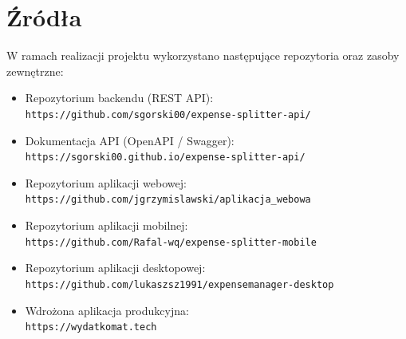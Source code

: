 \chapter{Źródła}

W ramach realizacji projektu wykorzystano następujące repozytoria oraz zasoby zewnętrzne:

\begin{itemize}
	\item Repozytorium backendu (REST API): \\
	\verb|https://github.com/sgorski00/expense-splitter-api/|
	
	\item Dokumentacja API (OpenAPI / Swagger): \\
	\verb|https://sgorski00.github.io/expense-splitter-api/|
	
	\item Repozytorium aplikacji webowej: \\
	\verb|https://github.com/jgrzymislawski/aplikacja_webowa|
	
	\item Repozytorium aplikacji mobilnej: \\
	\verb|https://github.com/Rafal-wq/expense-splitter-mobile|
	
	\item Repozytorium aplikacji desktopowej: \\
	\verb|https://github.com/lukaszsz1991/expensemanager-desktop|
	
	\item Wdrożona aplikacja produkcyjna: \\
	\verb|https://wydatkomat.tech|
\end{itemize}